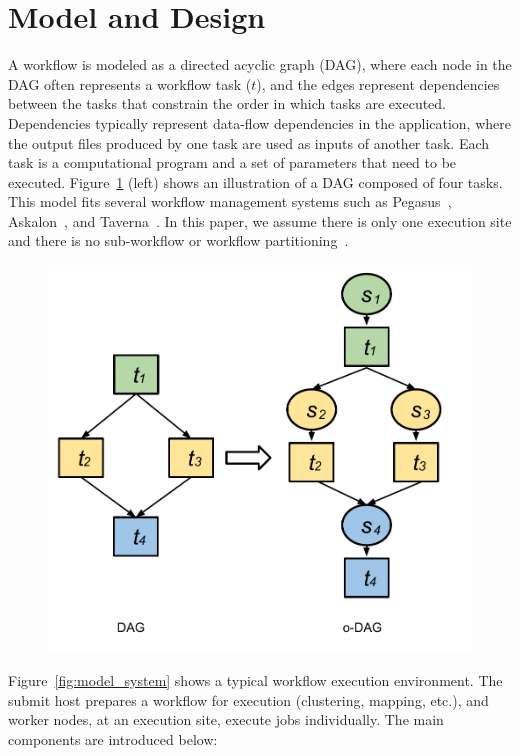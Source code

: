 \section{Model and Design}
\label{sec:model}


A workflow is modeled as a directed acyclic graph (DAG), where each node in the DAG often represents a workflow task ($t$), and the edges represent dependencies between the tasks that constrain the order in which tasks are executed. Dependencies typically represent data-flow dependencies in the application, where the output files produced by one task are used as inputs of another task. Each task is a computational program and a set of parameters that need to be executed. Figure~\ref{fig:model_odag} (left) shows an illustration of a DAG composed of four tasks. This model fits several workflow management systems such as Pegasus~\cite{Deelman:2005:PFM:1239649.1239653}, Askalon~\cite{Fahringer:2005:ATS:1064323.1064331}, and Taverna~\cite{Oinn:2006:TLC:1148437.1148448}. In this paper, we assume there is only one execution site and there is no sub-workflow or workflow partitioning~\cite{6217508}. 

\begin{figure}[!htb]
	\centering
	\includegraphics[width=0.7\linewidth]{figures/model/odag_color.pdf}
	\label{fig:model_odag}
\end{figure}

Figure~\ref{fig:model_system} shows a typical workflow execution environment. The submit host prepares a workflow for execution (clustering, mapping, etc.), and worker nodes, at an execution site, execute jobs individually. The main components are introduced below:

